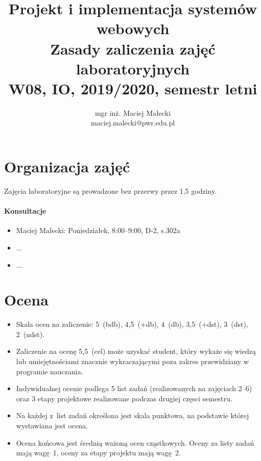 \documentclass[12pt]{article}
\title{Projekt i implementacja systemów webowych\\
    \large Zasady zaliczenia zajęć laboratoryjnych\\
    \large W08, IO, 2019/2020, semestr letni}
\author{mgr inż. Maciej Małecki\\ \small maciej.malecki@pwr.edu.pl}
\begin{document}
    \maketitle

    \section*{Organizacja zajęć}
        Zajęcia laboratoryjne są prowadzone bez przerwy przez 1,5 godziny.
        \paragraph*{Konsultacje}
        \begin{itemize}
            \item Maciej Małecki: Poniedziałek, 8:00--9:00, D-2, s.302a
			\item ...
			\item ...
        \end{itemize}
    \section*{Ocena}
        \begin{itemize}
            \item Skala ocen na zaliczenie: 5~(bdb), 4,5~(+db), 4~(db), 3,5~(+dst), 3~(dst), 2~(ndst).
            \item Zaliczenie na ocenę 5,5~(cel) może uzyskać student, który wykaże się wiedzą lub umiejętnościami znacznie wykraczającymi poza zakres przewidziany w programie nauczania.
            \item Indywidualnej ocenie podlega 5 list zadań (realizowanych na zajęciach 2--6) oraz 3 etapy projektowe realizowane podczas drugiej częsci semestru.
            \item Na każdej z~list zadań określona jest skala punktowa, na podstawie której wystawiana jest ocena.
            \item Ocena końcowa jest średnią ważoną ocen cząstkowych. Oceny za listy zadań mają wagę~1, oceny za etapy projektu mają wagę~2.
        \end{itemize}
\end{document}

